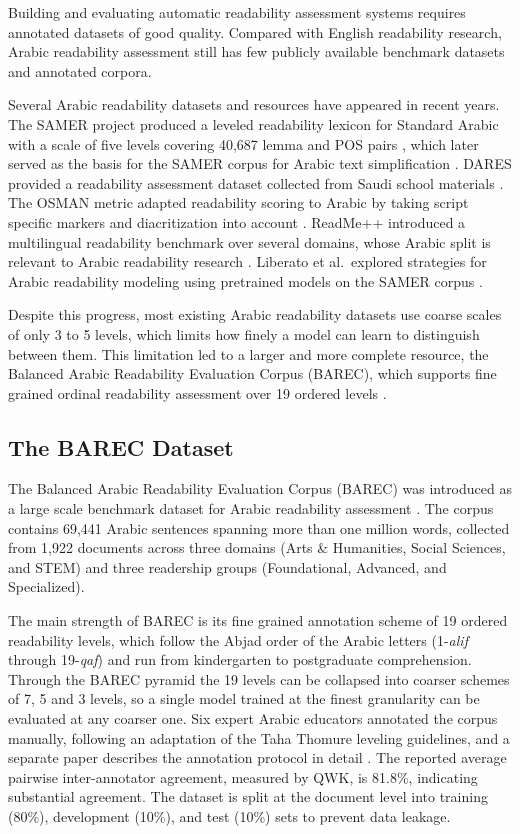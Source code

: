 \documentclass[12pt]{report}
\begin{document}
Building and evaluating automatic readability assessment systems requires annotated datasets of good quality. Compared with English readability research, Arabic readability assessment still has few publicly available benchmark datasets and annotated corpora\cite{nassiri2023approaches}.

Several Arabic readability datasets and resources have appeared in recent years. The SAMER project produced a leveled readability lexicon for Standard Arabic with a scale of five levels covering 40,687 lemma and POS pairs \cite{alkhalil2020samer}, which later served as the basis for the SAMER corpus for Arabic text simplification \cite{alhafni2024samer}. DARES provided a readability assessment dataset collected from Saudi school materials \cite{elhaj2024dares}. The OSMAN metric adapted readability scoring to Arabic by taking script specific markers and diacritization into account \cite{elhaj2016osman}. ReadMe++ introduced a multilingual readability benchmark over several domains, whose Arabic split is relevant to Arabic readability research \cite{naous2024readme}. Liberato et al.\ explored strategies for Arabic readability modeling using pretrained models on the SAMER corpus \cite{liberato2024strategies}.

Despite this progress, most existing Arabic readability datasets use coarse scales of only 3 to 5 levels, which limits how finely a model can learn to distinguish between them. This limitation led to a larger and more complete resource, the Balanced Arabic Readability Evaluation Corpus (BAREC), which supports fine grained ordinal readability assessment over 19 ordered levels \cite{elmadani2025barec}.

\subsection{The BAREC Dataset}

The Balanced Arabic Readability Evaluation Corpus (BAREC) was introduced as a large scale benchmark dataset for Arabic readability assessment \cite{elmadani2025barec}. The corpus contains 69,441 Arabic sentences spanning more than one million words, collected from 1,922 documents across three domains (Arts \& Humanities, Social Sciences, and STEM) and three readership groups (Foundational, Advanced, and Specialized).

The main strength of BAREC is its fine grained annotation scheme of 19 ordered readability levels, which follow the Abjad order of the Arabic letters (1-\textit{alif} through 19-\textit{qaf}) and run from kindergarten to postgraduate comprehension. Through the BAREC pyramid the 19 levels can be collapsed into coarser schemes of 7, 5 and 3 levels, so a single model trained at the finest granularity can be evaluated at any coarser one. Six expert Arabic educators annotated the corpus manually, following an adaptation of the Taha Thomure leveling guidelines, and a separate paper describes the annotation protocol in detail \cite{habash2025guidelines}. The reported average pairwise inter-annotator agreement, measured by QWK, is 81.8\%, indicating substantial agreement. The dataset is split at the document level into training (80\%), development (10\%), and test (10\%) sets to prevent data leakage.
\end{document}
